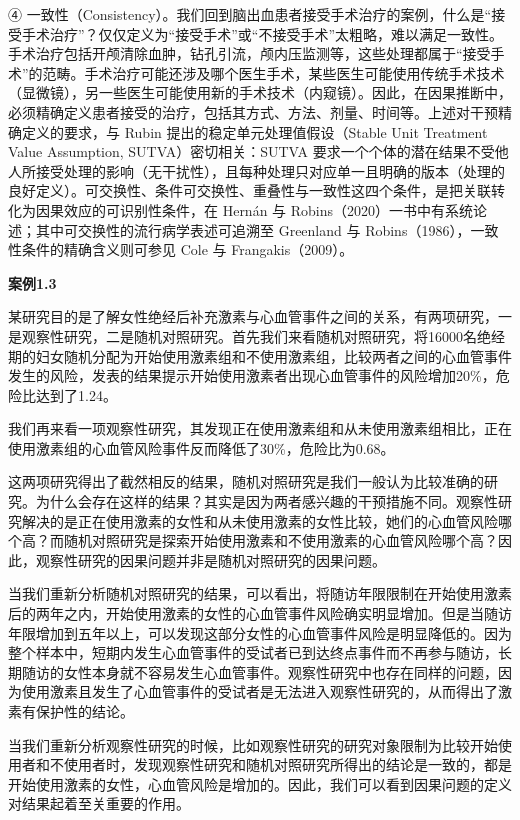 \documentclass[
  chinese-hans,
  letterpaper,
  DIV=11,
  numbers=noendperiod]{scrreprt}
\begin{document}
④
一致性（Consistency）。我们回到脑出血患者接受手术治疗的案例，什么是``接受手术治疗''？仅仅定义为``接受手术''或``不接受手术''太粗略，难以满足一致性。手术治疗包括开颅清除血肿，钻孔引流，颅内压监测等，这些处理都属于``接受手术''的范畴。手术治疗可能还涉及哪个医生手术，某些医生可能使用传统手术技术（显微镜），另一些医生可能使用新的手术技术（内窥镜）。因此，在因果推断中，必须精确定义患者接受的治疗，包括其方式、方法、剂量、时间等。上述对干预精确定义的要求，与
Rubin 提出的稳定单元处理值假设（Stable Unit Treatment Value Assumption,
SUTVA）密切相关：SUTVA
要求一个个体的潜在结果不受他人所接受处理的影响（无干扰性），且每种处理只对应单一且明确的版本（处理的良好定义）。可交换性、条件可交换性、重叠性与一致性这四个条件，是把关联转化为因果效应的可识别性条件，在
Hernán 与
Robins（2020）一书中有系统论述；其中可交换性的流行病学表述可追溯至
Greenland 与 Robins（1986），一致性条件的精确含义则可参见 Cole 与
Frangakis（2009）。

\textbf{案例1.3}

某研究目的是了解女性绝经后补充激素与心血管事件之间的关系，有两项研究，一是观察性研究，二是随机对照研究。首先我们来看随机对照研究，将16000名绝经期的妇女随机分配为开始使用激素组和不使用激素组，比较两者之间的心血管事件发生的风险，发表的结果提示开始使用激素者出现心血管事件的风险增加20\%，危险比达到了1.24。

我们再来看一项观察性研究，其发现正在使用激素组和从未使用激素组相比，正在使用激素组的心血管风险事件反而降低了30\%，危险比为0.68。

这两项研究得出了截然相反的结果，随机对照研究是我们一般认为比较准确的研究。为什么会存在这样的结果？其实是因为两者感兴趣的干预措施不同。观察性研究解决的是正在使用激素的女性和从未使用激素的女性比较，她们的心血管风险哪个高？而随机对照研究是探索开始使用激素和不使用激素的心血管风险哪个高？因此，观察性研究的因果问题并非是随机对照研究的因果问题。

当我们重新分析随机对照研究的结果，可以看出，将随访年限限制在开始使用激素后的两年之内，开始使用激素的女性的心血管事件风险确实明显增加。但是当随访年限增加到五年以上，可以发现这部分女性的心血管事件风险是明显降低的。因为整个样本中，短期内发生心血管事件的受试者已到达终点事件而不再参与随访，长期随访的女性本身就不容易发生心血管事件。观察性研究中也存在同样的问题，因为使用激素且发生了心血管事件的受试者是无法进入观察性研究的，从而得出了激素有保护性的结论。

当我们重新分析观察性研究的时候，比如观察性研究的研究对象限制为比较开始使用者和不使用者时，发现观察性研究和随机对照研究所得出的结论是一致的，都是开始使用激素的女性，心血管风险是增加的。因此，我们可以看到因果问题的定义对结果起着至关重要的作用。
\end{document}
